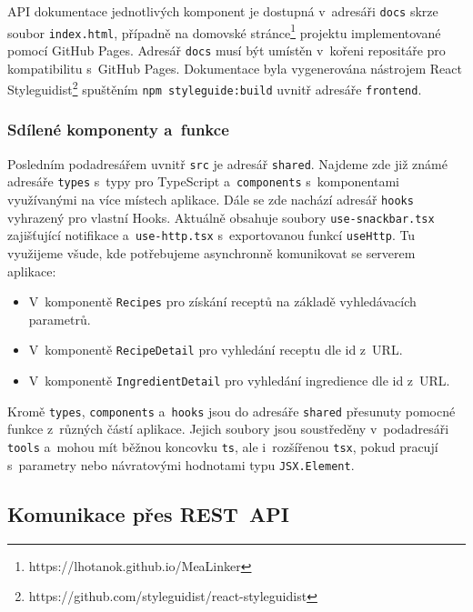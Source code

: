 API dokumentace jednotlivých komponent je dostupná v~adresáři \texttt{docs} skrze soubor \texttt{index.html}, případně na domovské stránce\footnote{https://lhotanok.github.io/MeaLinker} projektu implementované pomocí GitHub Pages. Adresář \texttt{docs} musí být umístěn v~kořeni repositáře pro kompatibilitu s~GitHub Pages. Dokumentace byla vygenerována nástrojem React Styleguidist\footnote{https://github.com/styleguidist/react-styleguidist} spuštěním \texttt{npm styleguide:build} uvnitř adresáře \texttt{frontend}.

\subsubsection{Sdílené komponenty a~funkce}

Posledním podadresářem uvnitř \texttt{src} je adresář \texttt{shared}. Najdeme zde již zná\-mé adresáře \texttt{types} s~typy pro TypeScript a~\texttt{components} s~komponentami využívanými na více místech aplikace. Dále se zde nachází adresář \texttt{hooks} vyhrazený pro vlastní Hooks. Aktuálně obsahuje soubory \texttt{use-snackbar.tsx} zajišťující notifikace a~\texttt{use-http.tsx} s~exportovanou funkcí \texttt{useHttp}. Tu využijeme všude, kde potřebujeme asynchronně komunikovat se serverem aplikace: 
\begin{itemize}
    \item V~komponentě \texttt{Recipes} pro získání receptů na základě vyhledávacích parametrů.
    \item V~komponentě \texttt{RecipeDetail} pro vyhledání receptu dle id z~URL.
    \item V~komponentě \texttt{IngredientDetail} pro vyhledání ingredience dle id z~URL.
\end{itemize}
Kromě \texttt{types}, \texttt{components} a~\texttt{hooks} jsou do adresáře \texttt{shared} přesunuty pomocné funkce z~různých částí aplikace. Jejich soubory jsou soustředěny v~podadresáři \texttt{tools} a~mohou mít běžnou koncovku \texttt{ts}, ale i~rozšířenou \texttt{tsx}, pokud pracují s~parametry nebo návratovými hodnotami typu \texttt{JSX.Element}.

\subsection{Komunikace přes REST~API}

